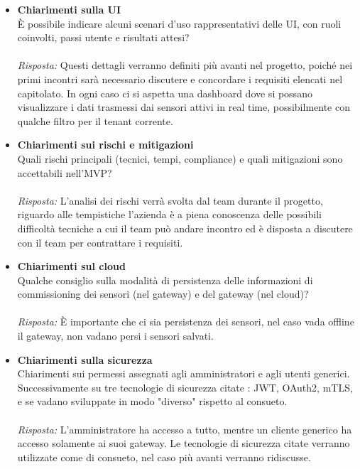 \documentclass[a4paper,12pt]{article}
\begin{document}
\begin{itemize}
    \item \textbf{Chiarimenti sulla UI}\\
    \noindent
    È possibile indicare alcuni scenari d'uso rappresentativi delle UI, con ruoli coinvolti, passi utente e risultati attesi?\\ \\
    \textit{Risposta:} 
    Questi dettagli verranno definiti più avanti nel progetto, poiché nei primi incontri sarà necessario discutere e concordare i requisiti elencati nel capitolato. In ogni caso ci si aspetta una dashboard dove si possano visualizzare i dati trasmessi dai sensori attivi in real time, possibilmente con qualche filtro per il tenant corrente.
    \vspace{1cm}

    \item \textbf{Chiarimenti sui rischi e mitigazioni}\\
    \noindent
    Quali rischi principali (tecnici, tempi, compliance) e quali mitigazioni sono accettabili nell'MVP? \\ \\
    \textit{Risposta:} 
    L'analisi dei rischi verrà svolta dal team durante il progetto, riguardo alle tempistiche l'azienda è a piena conoscenza delle possibili difficoltà tecniche a cui il team può andare incontro ed è disposta a discutere con il team per contrattare i requisiti.
    \vspace{1cm}
    
    \item \textbf{Chiarimenti sul cloud}\\
    \noindent
    Qualche consiglio sulla modalità di persistenza delle informazioni di commissioning dei sensori (nel gateway) e del gateway (nel cloud)? \\ \\
    \textit{Risposta:} 
    È importante che ci sia persistenza dei sensori, nel caso vada offline il gateway, non vadano persi i sensori salvati.
    \vspace{1cm}
    
    \item \textbf{Chiarimenti sulla sicurezza}\\
    \noindent
    Chiarimenti sui permessi assegnati agli amministratori e agli utenti generici. Successivamente su tre tecnologie di sicurezza citate : JWT, OAuth2, mTLS, e se vadano sviluppate in modo "diverso" rispetto al consueto.\\ \\
    \textit{Risposta:} 
    L'amministratore ha accesso a tutto, mentre un cliente generico ha accesso solamente ai suoi gateway.
    Le tecnologie di sicurezza citate verranno utilizzate come di consueto, nel caso più avanti verranno ridiscusse.
    \vspace{1cm}
    
\end{itemize}
\end{document}
